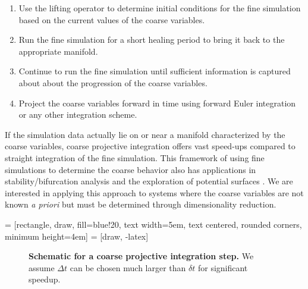 \documentclass[12pt]{article}
\begin{document}
\begin{enumerate}
\item Use the lifting operator to determine initial conditions for the fine simulation based on the current values of the coarse variables.
\item Run the fine simulation for a short healing period to bring it back to the appropriate manifold.
\item Continue to run the fine simulation until sufficient information is captured about about the progression of the coarse variables.
\item Project the coarse variables forward in time using forward Euler integration or any other integration scheme.
\end{enumerate}

If the simulation data actually lie on or near a manifold characterized by the coarse variables, coarse projective integration offers vast speed-ups compared to straight integration of the fine simulation. This framework of using fine simulations to determine the coarse behavior also has applications in stability/bifurcation analysis \cite{Theodoropoulos2000} \cite{Gear2002} and the exploration of potential surfaces \cite{Frewen2009}. We are interested in applying this approach to systems where the coarse variables are not known \textit{a priori} but must be determined through dimensionality reduction. \vspace{1mm}

 = [rectangle, draw, fill=blue!20, 
    text width=5em, text centered, rounded corners, minimum height=4em]
 = [draw, -latex]
\begin{figure}[here]
\caption{\textbf{Schematic for a coarse projective integration step.} We assume $\Delta t$ can be chosen much larger than $\delta t$ for significant speedup.}
\label{fig:cpi}
\end{figure}
\end{document}
